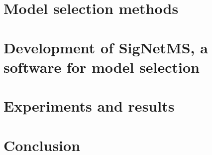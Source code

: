 \documentclass[12pt, twoside]{report}
\numberwithin{mydefinition}{section}
\numberwithin{mytheorem}{section}
\numberwithin{mylemma}{section}
\numberwithin{corollary}{section}
\begin{document}
\chapter{Model selection methods}
\label{chap:model_selection}


\chapter{Development of SigNetMS, a software for model selection}
\label{chap:development_signetms}


\chapter{Experiments and results}
\label{chap:experiments}


\chapter{Conclusion}
\label{chap:conclusion}


\newpage
\printbibliography
\end{document}

